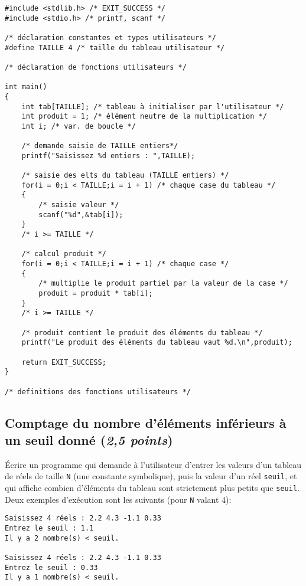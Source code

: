 \begin{correction}
\begin{small}
\begin{verbatim}
#include <stdlib.h> /* EXIT_SUCCESS */
#include <stdio.h> /* printf, scanf */

/* déclaration constantes et types utilisateurs */
#define TAILLE 4 /* taille du tableau utilisateur */

/* déclaration de fonctions utilisateurs */

int main()
{
    int tab[TAILLE]; /* tableau à initialiser par l'utilisateur */
    int produit = 1; /* élément neutre de la multiplication */
    int i; /* var. de boucle */

    /* demande saisie de TAILLE entiers*/
    printf("Saisissez %d entiers : ",TAILLE);

    /* saisie des elts du tableau (TAILLE entiers) */
    for(i = 0;i < TAILLE;i = i + 1) /* chaque case du tableau */
    {
        /* saisie valeur */
        scanf("%d",&tab[i]);
    }
    /* i >= TAILLE */

    /* calcul produit */
    for(i = 0;i < TAILLE;i = i + 1) /* chaque case */
    {
        /* multiplie le produit partiel par la valeur de la case */
        produit = produit * tab[i];
    }
    /* i >= TAILLE */

    /* produit contient le produit des éléments du tableau */
    printf("Le produit des éléments du tableau vaut %d.\n",produit);

    return EXIT_SUCCESS;
}

/* definitions des fonctions utilisateurs */

\end{verbatim}
\end{small}
\end{correction}
\subsection{Comptage du nombre d'éléments inférieurs à un seuil donné (\textit{2,5 points})}

Écrire un programme qui demande à l'utilisateur d'entrer les valeurs d'un tableau de réels de taille \verb|N| (une constante symbolique), puis la valeur d'un réel \verb|seuil|, et qui affiche combien d'éléments du tableau sont strictement plus petits que \verb|seuil|. Deux exemples d'exécution sont les suivants (pour \verb|N| valant 4):
\begin{small}
\begin{verbatim}
Saisissez 4 réels : 2.2 4.3 -1.1 0.33
Entrez le seuil : 1.1
Il y a 2 nombre(s) < seuil.

Saisissez 4 réels : 2.2 4.3 -1.1 0.33
Entrez le seuil : 0.33
Il y a 1 nombre(s) < seuil.
\end{verbatim}
\end{small}

